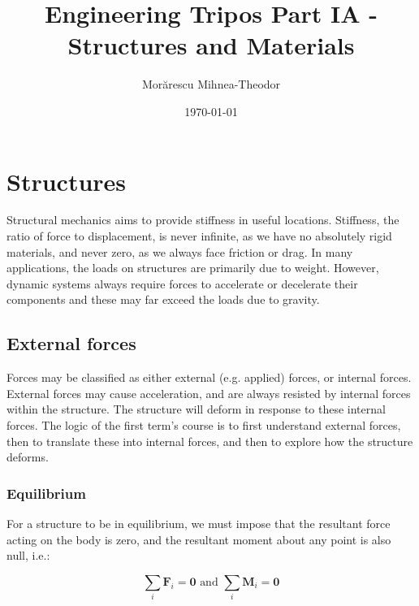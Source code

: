 \documentclass{article}
\begin{document}
\title{Engineering Tripos Part IA - Structures and Materials}
\author{Morărescu Mihnea-Theodor}
\date{\today}

\maketitle

\newpage

\tableofcontents

\newpage

\section{Structures}

Structural mechanics aims to provide stiffness in useful locations. Stiffness, the ratio of force to displacement, is never infinite, as we have no absolutely rigid materials, and never zero, as we always face friction or drag. In many applications, the loads on structures are primarily due to weight. However, dynamic systems always require forces to accelerate or decelerate their components and these may far exceed the loads due to gravity.

\subsection{External forces}

Forces may be classified as either external (e.g. applied) forces, or internal forces. External forces may cause acceleration, and are always resisted by internal forces within the structure. The structure will deform in response to these internal forces. The logic of the first term's course is to first understand external forces, then to translate these into internal forces, and then to explore how the structure deforms.

\subsubsection{Equilibrium}

\begin{proposition}
    For a structure to be in equilibrium, we must impose that the resultant force acting on the body is zero, and the resultant moment about any point is also null, i.e.:

    \[ \sum_{i} \mathbf{F}_i = \mathbf{0} \text{   and   } \sum_{i} \mathbf{M}_i = \mathbf{0} \]
\end{proposition}
\end{document}
